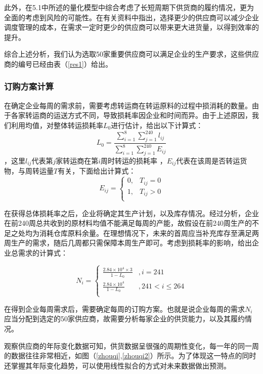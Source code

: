 \documentclass{my_paper}
\begin{document}
此外，在5.1中所述的量化模型中综合考虑了长短周期下供货商的履约情况，更为全面的考虑到风险的可能性。在有关资料\cite{1}中指出，选择更少的供应商可以减少企业调度管理的成本，在需求一定时更少的供应商可以带来更大进货量，以得到效率的提升。

综合上述分析，我们认为选取50家重要供应商可以满足企业的生产要求，这些供应商的编号已经由表（\ref{res1}）给出。

\subsubsection{订购方案计算}
在确定企业每周的需求前，需要考虑转运商在转运原料的过程中损消耗的数量。由于各家转运商的运送方式不同，导致损耗率因企业和时间而异。由于上述原因，我们利用均值，对整体转运损耗率$L_0$进行估计，给出以下计算式：
\begin{equation}
L_0 = \frac{\sum\limits^8_{i=1}\sum\limits^{240}_{j=1}l_{ij}}{\sum\limits^8_{i=1}\sum\limits^{240}_{j=1}E_{ij}}
\label{l0}
\end{equation}
，这里$l_{ij}$代表第$j$家转运商在第$i$周时转运的损耗率 ，$ E_{ij} $代表在该周是否转运货物，与周转运量$T$有关，下面给出计算式：
\begin{equation}
E_{ij} = \begin{cases}
    0 ,& T_{ij}=0\\
    1 ,& T_{ij}>0\\
\end{cases}
\label{eij}
\end{equation}

在获得总体损耗率之后，企业将确定其生产计划，以及库存情况。经过分析，企业在前240周总共收到的原材料均值不能满足每周的产能，故假设在前240周生产的不足之处均为消耗仓库原料余量。在理想情况下，未来的首周应当补充库存至满足两周生产的需求，随后几周都只需保障本周生产即可。考虑到损耗率的影响，给出企业总需求的计算式：

\begin{equation}
N_i = \begin{cases}
    \frac{2.84\times 10^4 \times 3 }{1-L_0}&,i=241 \\
    \frac{2.84\times 10^4 }{1-L_0}&,241<i\leq 264\\
\end{cases}
\label{ni}
\end{equation}

在得到企业每周需求后，需要确定每周的订购方案。也就是说企业每周的需求$N_i$应当分配到选定的50家供应商，故需要分析每家企业的供货能力，以及其履约情况。

观察供应商的年际变化数据可知，供货数据呈很强的周期性变化，每一年的同一周的数据往往非常相近，如图（\ref{zhouqi},\ref{zhouqi2}）所示。为了体现这一特点的同时还掌握其年际变化趋势，可以使用线性拟合的方式对未来数据做出预测。
\end{document}
